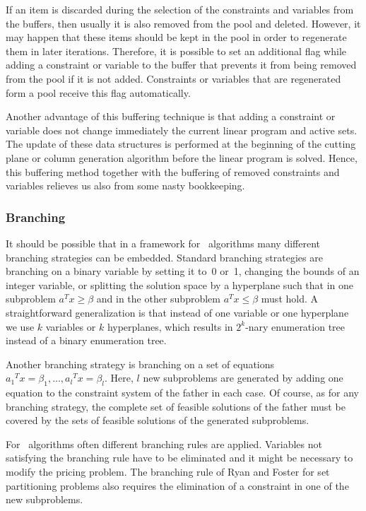 If an item is discarded during the selection of the constraints
and variables from the buffers, then usually it is also removed from
the pool and deleted. However, it may happen that these items should
be kept in the pool in order to regenerate them in later iterations.
Therefore, it is possible to set an additional flag while adding
a constraint or variable to the buffer that prevents it from being removed
from the pool if it is not added. Constraints or variables that are
regenerated form a pool receive this flag automatically.

Another advantage of this buffering technique is that adding a constraint or
variable does not change immediately the current linear program and
active sets. The update of these data structures is performed
at the beginning of the cutting plane or column generation algorithm
before the linear program is solved. Hence, this buffering method together
with the buffering of removed constraints and variables relieves
us also from some nasty bookkeeping.

\subsubsection{Branching}\nobreak
\label{section:DesignBranching}

It should be possible that in a framework for \lpbab\ algorithms
many different branching strategies can be embedded. Standard
branching strategies are branching on a binary
variable by setting it to~0 or~1, changing the
bounds of an integer variable, or splitting
the solution space by a hyperplane such that in one subproblem
$a^T x \ge \beta$ and in the other subproblem
$a^T x \le \beta$ must hold. A straightforward generalization
is that instead of one variable or one hyperplane we use $k$ variables
or $k$ hyperplanes, which results in $2^k$-nary enumeration tree
instead of a binary enumeration tree.

Another branching strategy is branching on a set of equations
${a_1}^T x = \beta_1, \dots, {a_l}^T x = \beta_l$.
Here, $l$ new subproblems are generated by adding one equation to the
constraint system of the father in each case. Of course, as for any
branching strategy, the complete set of feasible solutions of the father
must be covered by the sets of feasible solutions of the generated subproblems.

For \bap\ algorithms often different branching rules
are applied. Variables not satisfying the branching rule have
to be eliminated and it might be necessary to modify the pricing
problem. The branching rule of Ryan and Foster \cite{RF81} for set partitioning
problems also requires the elimination of a constraint in one
of the new subproblems.

